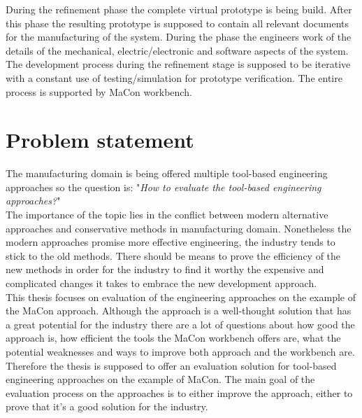  During the refinement phase the complete virtual prototype is being build. After this phase the resulting prototype is supposed to contain all relevant documents for the manufacturing of the system. During the phase the engineers work of the details of the mechanical, electric/electronic and software aspects of the system. The development process during the refinement stage is supposed to be iterative with a constant use of testing/simulation for prototype verification. The entire process is supported by MaCon workbench.\\ 

\section{Problem statement} \label{section:problem}
The manufacturing domain is being offered multiple tool-based engineering approaches so the question is: "\textit{How to evaluate the tool-based engineering approaches?}"\\

The importance of the topic lies in the conflict between modern alternative approaches and conservative methods in manufacturing domain. Nonetheless the modern approaches promise more effective engineering, the industry tends to stick to the old methods. There should be means to prove the efficiency of the new methods in order for the industry to find it worthy the expensive and complicated changes it takes to embrace the new development approach. \\

This thesis focuses on evaluation of the engineering approaches on the example of the MaCon approach. Although the approach is a well-thought solution that has a great potential for the industry there are a lot of questions about how good the approach is, how efficient the tools the MaCon workbench offers are, what the potential weaknesses and ways to improve both approach and the workbench are. \\


Therefore the thesis is supposed to offer an evaluation solution for tool-based engineering approaches on the example of MaCon. The main goal of the evaluation process on the approaches is to either improve the approach, either to prove that it's a good solution for the industry.  \\

